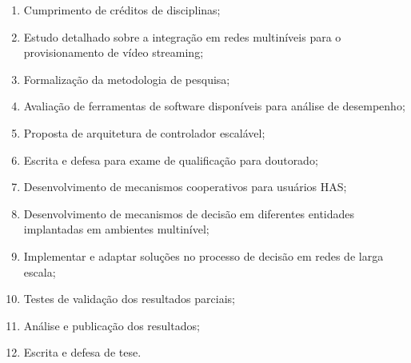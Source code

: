 \begin{enumerate}
	\item Cumprimento de créditos de disciplinas;
    \item Estudo detalhado sobre a integração em redes multiníveis para o provisionamento de vídeo streaming;
    \item Formalização da metodologia de pesquisa;
    \item Avaliação de ferramentas de software disponíveis para análise de desempenho;
    \item Proposta de arquitetura de controlador escalável;
    \item Escrita e defesa para exame de qualificação para doutorado;
    \item Desenvolvimento de mecanismos cooperativos para usuários HAS;
    \item Desenvolvimento de mecanismos de decisão em diferentes entidades implantadas em ambientes multinível;
    \item Implementar e adaptar soluções no processo de decisão em redes de larga escala;
    \item Testes de validação dos resultados parciais;
    \item Análise e publicação dos resultados;
    \item Escrita e defesa de tese.
\end{enumerate}

